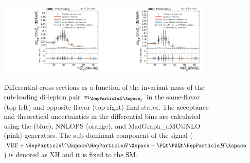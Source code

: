 
\begin{center}
	\begin{figure}[!htb]
		\centering
		\includegraphics[width=0.48\textwidth]{Images/H4L/ZCands/model_v4/massZ2_unfoldwith_4l_SM_125_asimov.pdf}
		\includegraphics[width=0.48\textwidth]{Images/H4L/ZCands/model_v4/massZ2_unfoldwith_2e2mu_SM_125_asimov.pdf}\\
		\caption{
			Differential cross sections as a function of the invariant mass of the sub-leading di-lepton pair $m_{\PZ_{2}}$ in the same-flavor (top left) and opposite-flavor (top right)  final states.
			The acceptance and theoretical uncertainties in the differential bins are calculated using the \POWHEG (blue), NNLOPS (orange), and MadGraph\_aMC@NLO (pink) generators.
			The sub-dominant component of the signal ($\VBF + \VH + \ttH$) is denoted as XH and it is fixed to the SM.
			\label{fig:fidMZ2}}
	\end{figure}
\end{center}


